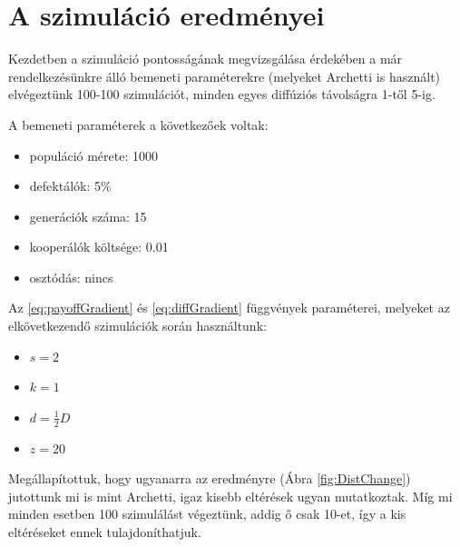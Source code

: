 
\section{A szimuláció eredményei}

Kezdetben a szimuláció pontosságának megvizsgálása érdekében a már rendelkezésünkre álló bemeneti paraméterekre (melyeket Archetti is használt\cite{archetti2016cooperation}) elvégeztünk 100-100 szimulációt, minden egyes diffúziós távolságra 1-től 5-ig.

\begin{multicols}{2}
	A bemeneti paraméterek a következőek voltak:
	\begin{itemize}[noitemsep]
		\item populáció mérete: 1000
		\item defektálók: 5\%
		\item generációk száma: 15
		\item kooperálók költsége: 0.01
		\item osztódás: nincs
	\end{itemize}
	Az \eqref{eq:payoffGradient} és \eqref{eq:diffGradient} függvények paraméterei, melyeket az elkövetkezendő szimulációk során használtunk:
	\begin{itemize}[noitemsep]
		\item $s = 2$
		\item $k = 1$
		\item $d = \frac{1}{2}D$
		\item $z = 20$
	\end{itemize}	
\end{multicols}

Megállapítottuk, hogy ugyanarra az eredményre (Ábra \ref{fig:DistChange}) jutottunk mi is mint Archetti\cite{archetti2016cooperation}, igaz kisebb eltérések ugyan mutatkoztak. Míg mi minden esetben 100 szimulálást végeztünk, addig ő csak 10-et, így a kis eltéréseket ennek tulajdoníthatjuk.

